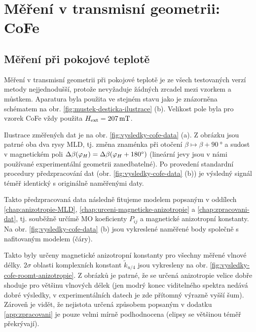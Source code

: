 \section{Měření v transmisní geometrii: CoFe}
\label{chap:vysledky-cofe}

\subsection{Měření při pokojové teplotě}
\label{chap:vysledky-cofe-roomt}

Měření v transmisní geometrii při pokojové teplotě je ze všech testovaných verzí metody nejjednodušší, protože nevyžaduje žádných zrcadel mezi vzorkem a můstkem.
Aparatura byla použita ve stejném stavu jako je znázorněna schématem na obr. \ref{fig:mustek-desticka-ilustrace} (b).
Velikost pole byla pro vzorek CoFe vždy použita $H_\textrm{ext}=\SI{207}{\milli\tesla}$.

Ilustrace změřených dat je na obr. \ref{fig:vysledky-cofe-data} (a).
Z obrázku jsou patrné oba dva rysy MLD, tj. změna znaménka při otočení $\beta \mapsto \beta+\SI{90}{\degree}$ a sudost v magnetickém poli $\Delta\beta(\varphi_H)=\Delta\beta(\varphi_H+\SI{180}{\degree})$ (lineární jevy jsou v námi používané experimentální geometrii zanedbatelné).
Po provedení standardní procedury předzpracování dat (obr. \ref{fig:vysledky-cofe-data} (b)) je výsledný signál téměř identický s originálně naměřenými daty.

Takto předzpracovaná data následně fitujeme modelem popsaným v oddílech \ref{chap:anizotropie-MLD}, \ref{chap:urceni-magneticke-anizotropie} a \ref{chap:zpracovani-dat}, tj. souběžně určímě MO koeficienty $P_{ij}$ a magnetické anizotropní konstanty.
Na obr. \ref{fig:vysledky-cofe-data} (b) jsou vykreslené naměřené body společně s nafitovaným modelem (čáry).

Takto byly určeny magnetické anizotropní konstanty pro všechny měřené vlnové délky.
$2\sigma$ oblasti komplexních konstant $\tilde{k}_{u/4}$ jsou vykresleny na obr. \ref{fig:vysledky-cofe-roomt-anizotropie}.
Z obrázků je patrné, že se určená anizotropie velice dobře shoduje pro většinu vlnových délek (jen modrý konec viditelného spektra nedává dobré výsledky, v experimentálních datech je zde přítomný výrazně vyšší šum).
Zároveň je vidět, že nejistota určená způsobem popsaným v dodatku \ref{app:zpracovani} je pouze velmi mírně podhodnocena (elipsy se většinou téměř překrývají).

